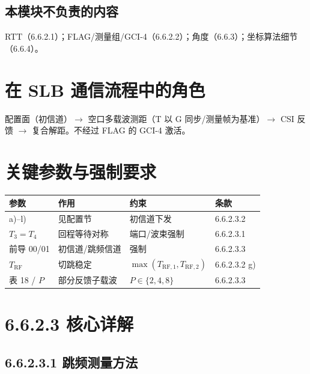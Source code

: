 \documentclass[11pt,a4paper]{ctexart}
\begin{document}
\subsection{本模块不负责的内容}

RTT（6.6.2.1）；FLAG/测量组/GCI-4（6.6.2.2）；角度（6.6.3）；坐标算法细节（6.6.4）。

\section{在 SLB 通信流程中的角色}

配置面（初信道）$\rightarrow$ 空口多载波测距（T 以 G 同步/测量帧为基准）$\rightarrow$ CSI 反馈 $\rightarrow$ 复合解距。不经过 FLAG 的 GCI-4 激活。

\section{关键参数与强制要求}

\begin{table}[h]
\centering
\small
\begin{tabular}{L{2.6cm}L{5.2cm}L{3.5cm}l}
\toprule
\textbf{参数} & \textbf{作用} & \textbf{约束} & \textbf{条款} \\
\midrule
a)--l) & 见配置节 & 初信道下发 & 6.6.2.3.2 \\
$T_3=T_4$ & 回程等待对称 & 端口/波束强制 & 6.6.2.3.1 \\
前导 00/01 & 初信道/跳频信道 & 强制 & 6.6.2.3.3 \\
$T_{\mathrm{RF}}$ & 切跳稳定 & $\max(T_{\mathrm{RF},1},T_{\mathrm{RF},2})$ & 6.6.2.3.2 g) \\
表 18 / $P$ & 部分反馈子载波 & $P\in\{2,4,8\}$ & 6.6.2.3.3 \\
\bottomrule
\end{tabular}
\end{table}

\section{6.6.2.3 核心详解}

\subsection{6.6.2.3.1 跳频测量方法}
\label{sec:method}
\end{document}
